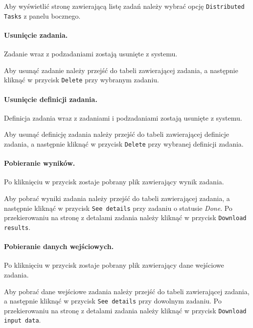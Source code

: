 \documentclass[a4paper,11pt,twoside]{report}
\theoremstyle{definition}
\begin{document}
                Aby wyświetlić stronę zawierającą listę zadań należy wybrać opcję \texttt{Distributed Tasks} z panelu bocznego.

            \paragraph{Usunięcie zadania.}  
                \noindent Zadanie wraz z podzadaniami zostają usunięte z systemu.
                
                Aby usunąć zadanie należy przejść do tabeli zawierającej zadania, a następnie kliknąć w przycisk \texttt{Delete} przy wybranym zadaniu.

            \paragraph{Usunięcie definicji zadania.}    
                \noindent Definicja zadania wraz z zadaniami i podzadaniami zostają usunięte z systemu.
                
                Aby usunąć definicję zadania należy przejść do tabeli zawierającej definicje zadania, a następnie kliknąć w przycisk \texttt{Delete} przy wybranej definicji zadania. 

            \paragraph{Pobieranie wyników.} 
                \noindent Po kliknięciu w przycisk zostaje pobrany plik zawierający
                wynik zadania.
                
                Aby pobrać wyniki zadania należy przejść do tabeli zawierającej zadania, a następnie kliknąć w przycisk \texttt{See details} przy zadaniu o statusie \textit{Done}. Po przekierowaniu na stronę z detalami zadania należy kliknąć w przycisk \texttt{Download results}.

            \paragraph{Pobieranie danych wejściowych.}  
                \noindent Po kliknięciu w przycisk zostaje pobrany plik zawierający dane wejściowe zadania.
                
                Aby pobrać dane wejściowe zadania należy przejść do tabeli zawierającej zadania, a następnie kliknąć w przycisk \texttt{See details} przy dowolnym zadaniu. Po przekierowaniu na stronę z detalami zadania należy kliknąć w przycisk \texttt{Download input data}.
\end{document}
